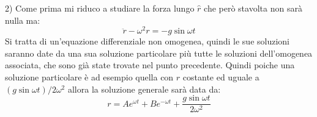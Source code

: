 \documentclass[../main.tex]{subfiles}
\begin{document}
2) Come prima mi riduco a studiare la forza lungo $\hat{r}$ che però stavolta non sarà nulla ma:
\begin{equation}\label{avr:4}
  \ddot{r}-\omega^2r=-g \sin{\omega t}
 \end{equation}
Si tratta di un'equazione differenziale non omogenea, quindi le sue soluzioni saranno date da una sua soluzione particolare più tutte le soluzioni dell'omogenea associata,
che sono già state trovate nel punto precedente. Quindi poiche una soluzione particolare è ad esempio quella con $r$ costante ed uguale a 
$(g \sin{\omega t})/2\omega^2$ allora la soluzione generale sarà data da:
\begin{equation}\label{avr:5}
 r=Ae^{\omega t}+Be^{-\omega t}+\frac{g \sin{\omega t}}{2\omega^2}
\end{equation}
\end{document}

